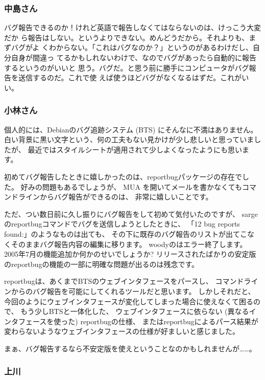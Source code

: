 \documentclass[mingoth,a4paper]{jsarticle}
\begin{document}
\subsubsection{中島さん}

 バグ報告できるのか！けれど英語で報告しなくてはならないのは、けっこう大変だか
ら報告はしない。というよりできない。めんどうだから。それよりも、まずバグがよ
くわからない。「これはバグなのか？」というのがあるわけだし、自分自身が間違っ
てるかもしれないわけで、なのでバグがあったら自動的に報告するというのがいいと
思う。バグだ。と思う前に勝手にコンピュータがバグ報告を送信するのだ。これで使
えば使うほどバグがなくなるはずだ。これがいい。

\subsubsection{小林さん}

個人的には、Debianのバグ追跡システム (BTS) にそんなに不満はありません。
白い背景に黒い文字という、何の工夫もない見かけが少し悲しいと思っていましたが、
最近ではスタイルシートが適用されて少しよくなったようにも思います。

初めてバグ報告したときに嬉しかったのは、reportbugパッケージの存在でした。
好みの問題もあるでしょうが、
MUA を開いてメールを書かなくてもコマンドラインからバグ報告ができるのは、
非常に嬉しいことです。

ただ、つい数日前に久し振りにバグ報告をして初めて気付いたのですが、
sargeのreportbugコマンドでバグを送信しようとしたときに、
「12 bug reports found:」のようなものは出ても、
その下に既存のバグ報告のリストが出てこなくそのままバグ報告内容の編集に移ります。
woodyのはエラー終了します。
2005年7月の機能追加か何かのせいでしょうか?
リリースされたばかりの安定版のreportbugの機能の一部に明確な問題が出るのは残念です。

reportbugは、あくまでBTSのウェブインタフェースをパースし、
コマンドラインからのバグ報告を可能にしてくれるツールだと思います。
しかしそれだと、
今回のようにウェブインタフェースが変化してしまった場合に使えなくて困るので、
もう少しBTSと一体化した、
ウェブインタフェースに依らない (異なるインタフェースを使った) reportbugの仕様、
またはreportbugによるパース結果が変わらないようなウェブインタフェースの仕様が好ましいと感じました。

まぁ、バグ報告するなら不安定版を使えということなのかもしれませんが……。

\subsubsection{上川}
\end{document}
